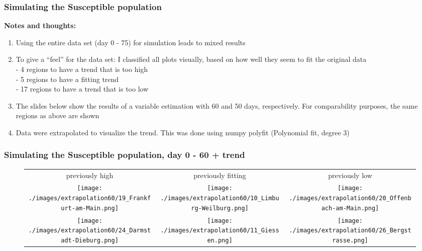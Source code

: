 \documentclass{beamer}
\begin{document}
\begin{frame}
	\frametitle{Simulating the Susceptible population}
	\textbf{Notes and thoughts:}
	\begin{enumerate}[$\bullet$]
		\item Using the entire data set (day 0 - 75) for simulation leads to mixed results
		\item To give a ``feel'' for the data set: I classified all plots visually, based on how well they seem to fit the original data\\
			- 4 regions to have  a trend that is too high\\
			- 5 regions to have a fitting trend\\
			- 17 regions to have a trend that is too low
		\item The slides below show the results of a variable estimation with 60 and 50 days, respectively. For comparability purposes, the same regions as above are shown
		\item Data were extrapolated to visualize the trend. This was done using numpy polyfit (Polynomial fit, degree 3)
	\end{enumerate}
\end{frame}

\begin{frame}
	\frametitle{Simulating the Susceptible population, day 0 - 60 + trend}
	\begin{center}
		\begin{figure}
			\begin{adjustwidth}{-0.8cm}{}
			\begin{tabular}{ccc}
				previously high & previously fitting & previously low \\
				\texttt{[image: ./images/extrapolation60/19\_Frankfurt-am-Main.png]}
					& \texttt{[image: ./images/extrapolation60/10\_Limburg-Weilburg.png]}
					& \texttt{[image: ./images/extrapolation60/20\_Offenbach-am-Main.png]} \\
				\texttt{[image: ./images/extrapolation60/24\_Darmstadt-Dieburg.png]}
					& \texttt{[image: ./images/extrapolation60/11\_Giessen.png]}
					& \texttt{[image: ./images/extrapolation60/26\_Bergstrasse.png]}
			\end{tabular}
			\end{adjustwidth}
		\end{figure}
	\end{center}
\end{frame}
\end{document}
